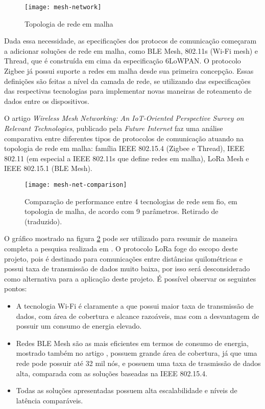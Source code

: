 \documentclass[../monografia.tex]{subfiles}
\begin{document}
\begin{figure}[h!]
\centering
	\texttt{[image: mesh-network]}
	\caption{Topologia de rede em malha}
	\label{fig:Rede em malha}
\end{figure}

Dada essa necessidade, as epecificações dos protocos de comunicação começaram a adicionar soluções de rede em malha, como BLE Mesh, 802.11s (Wi-Fi mesh) e Thread, que é construída em cima da especificação 6LoWPAN. O protocolo Zigbee já possui suporte a redes em malha desde sua primeira concepção. Essas definições são feitas a nível da camada de rede, se utilizando das especificações das respectivas tecnologias para implementar novas maneiras de roteamento de dados entre os dispositivos.

O artigo \textit{Wireless Mesh Networking: An IoT-Oriented Perspective Survey on Relevant Technologies}, publicado pela \textit{Future Internet}\cite{mesh-net-comparison} faz uma análise comparativa entre diferentes tipos de protocolos de comunicação atuando na topologia de rede em malha: família IEEE 802.15.4 (Zigbee e Thread), IEEE 802.11 (em especial a IEEE 802.11s que define redes em malha), LoRa Mesh e IEEE 802.15.1 (BLE Mesh).

\begin{figure}[h!]
\centering
	\texttt{[image: mesh-net-comparison]}
	\caption{
		Comparação de performance entre 4 tecnologias de rede sem fio, em topologia de malha, de acordo com 9 parâmetros. Retirado de \cite{mesh-net-comparison} (traduzido).
	}
	\label{fig:Comparação redes mesh}
\end{figure}

O gráfico mostrado na figura \ref{fig:Comparação redes mesh}  pode ser utilizado para resumir de maneira completa a pesquisa realizada em \cite{mesh-net-comparison}. O protocolo LoRa foge do escopo deste projeto, pois é destinado para comunicações entre distâncias quilométricas e possui taxa de transmissão de dados muito baixa, por isso será desconsiderado como alternativa para a aplicação deste projeto. É possível observar os seguintes pontos:

\begin{itemize}
	\item A tecnologia Wi-Fi é claramente a que possui maior taxa de transmissão de dados, com área de cobertura e alcance razoáveis, mas com a desvantagem de possuir um consumo de energia elevado.
	\item Redes BLE Mesh são as mais eficientes em termos de consumo de energia, mostrado também no artigo \cite{zigbee-ble-power}, possuem grande área de cobertura, já que uma rede pode possuir até 32 mil nós\cite{BLE-mesh}, e possuem uma taxa de trasmissão de dados alta, comparada com as soluções baseadas na IEEE 802.15.4.
	\item Todas as soluções apresentadas possuem alta escalabilidade e níveis de latência comparáveis.
\end{itemize}
\end{document}
